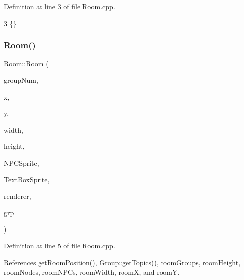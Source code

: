 Definition at line 3 of file Room.\+cpp.


\begin{DoxyCode}
3 \{\}
\end{DoxyCode}
\mbox{\label{class_room_a2f37c248b2d9882531e01ab675ea54f0}} 
\subsubsection{\texorpdfstring{Room()}{Room()}\hspace{0.1cm}{\footnotesize\ttfamily [2/2]}}
{\footnotesize\ttfamily Room\+::\+Room (\begin{DoxyParamCaption}\item[{int}]{group\+Num,  }\item[{int}]{x,  }\item[{int}]{y,  }\item[{int}]{width,  }\item[{int}]{height,  }\item[{std\+::string}]{N\+P\+C\+Sprite,  }\item[{std\+::string}]{Text\+Box\+Sprite,  }\item[{S\+D\+L\+\_\+\+Renderer $\ast$}]{renderer,  }\item[{\hyperlink{class_group}{Group}}]{grp }\end{DoxyParamCaption})}



Definition at line 5 of file Room.\+cpp.



References get\+Room\+Position(), Group\+::get\+Topics(), room\+Groups, room\+Height, room\+Nodes, room\+N\+P\+Cs, room\+Width, roomX, and roomY.


